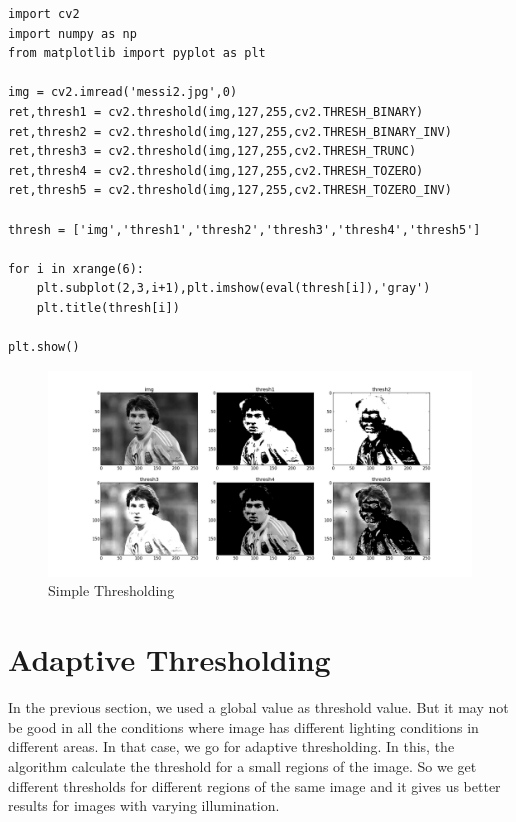 \documentclass[a4paper,11pt]{book}
\begin{document}
\bigskip
\begin{lstlisting}
import cv2
import numpy as np
from matplotlib import pyplot as plt

img = cv2.imread('messi2.jpg',0)
ret,thresh1 = cv2.threshold(img,127,255,cv2.THRESH_BINARY)
ret,thresh2 = cv2.threshold(img,127,255,cv2.THRESH_BINARY_INV)
ret,thresh3 = cv2.threshold(img,127,255,cv2.THRESH_TRUNC)
ret,thresh4 = cv2.threshold(img,127,255,cv2.THRESH_TOZERO)
ret,thresh5 = cv2.threshold(img,127,255,cv2.THRESH_TOZERO_INV)

thresh = ['img','thresh1','thresh2','thresh3','thresh4','thresh5']

for i in xrange(6):
    plt.subplot(2,3,i+1),plt.imshow(eval(thresh[i]),'gray')
    plt.title(thresh[i])

plt.show()
\end{lstlisting}
\bigskip


\begin{figure}[htp]
\centering
\includegraphics[scale=0.4]{img/thresh_1.png}
\caption{Simple Thresholding}
\label{fig_thresh_1}
\end{figure}

\section{Adaptive Thresholding}

In the previous section, we used a global value as threshold value. But it may not be good in all the conditions where image has different lighting conditions in different areas. In that case, we go for adaptive thresholding. In this, the algorithm calculate the threshold for a small regions of the image. So we get different thresholds for different regions of the same image and it gives us better results for images with varying illumination.\\
\end{document}
